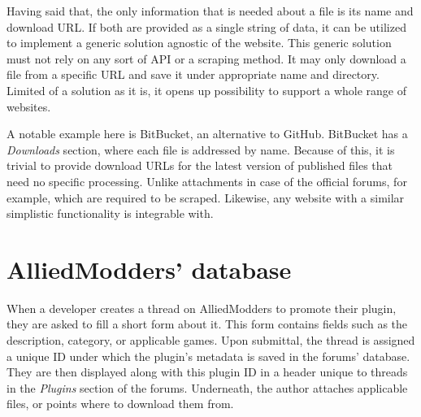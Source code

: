 Having said that, the only information that is needed about a file is its name and download URL\@.
If both are provided as a single string of data, it can be utilized to implement a generic solution agnostic of the website.
This generic solution must not rely on any sort of API or a scraping method.
It may only download a file from a specific URL and save it under appropriate name and directory.
Limited of a solution as it is, it opens up possibility to support a whole range of websites.

A notable example here is BitBucket, an alternative to GitHub.
BitBucket has a \textit{Downloads} section, where each file is addressed by name.
Because of this, it is trivial to provide download URLs for the latest version of published files that need no specific processing.
Unlike attachments in case of the official forums, for example, which are required to be scraped.
Likewise, any website with a similar simplistic functionality is integrable with.

\section{AlliedModders' database}

When a developer creates a thread on AlliedModders to promote their plugin, they are asked to fill a short form about it.
This form contains fields such as the description, category, or applicable games.
Upon submittal, the thread is assigned a unique ID under which the plugin's metadata is saved in the forums' database.
They are then displayed along with this plugin ID in a header unique to threads in the \textit{Plugins} section of the forums.
Underneath, the author attaches applicable files, or points where to download them from.

